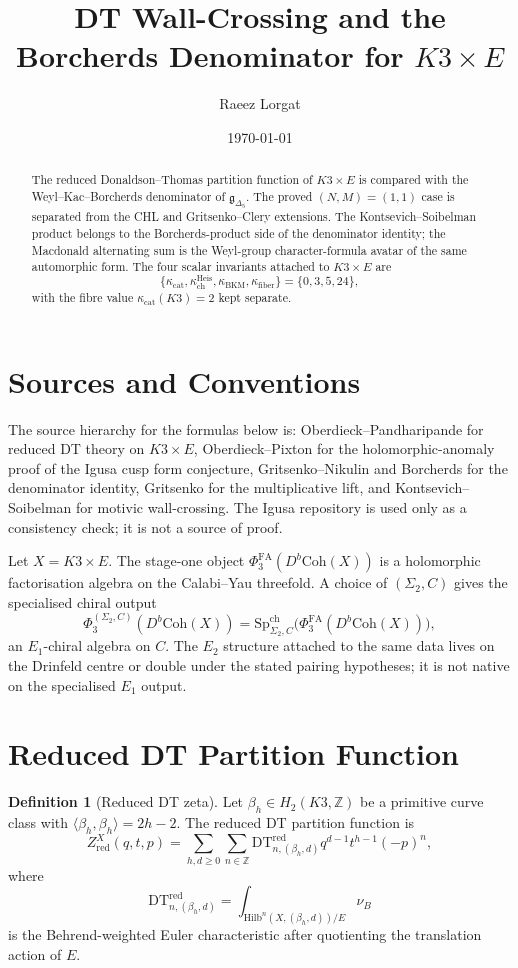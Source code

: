 \documentclass[11pt]{article}
\title{DT Wall-Crossing and the Borcherds Denominator for $K3\times E$}
\author{Raeez Lorgat}
\date{\today}
\theoremstyle{definition}
\newtheorem{definition}[theorem]{Definition}
\providecommand{\Z}{\mathbb{Z}}
\providecommand{\DT}{\mathrm{DT}}
\providecommand{\Hilb}{\mathrm{Hilb}}
\providecommand{\fg}{\mathfrak{g}}
\providecommand{\kch}{\kappa_{\mathrm{ch}}}
\providecommand{\kcat}{\kappa_{\mathrm{cat}}}
\providecommand{\kBKM}{\kappa_{\mathrm{BKM}}}
\providecommand{\kfib}{\kappa_{\mathrm{fiber}}}
\providecommand{\Eone}{E_1}
\providecommand{\Etwo}{E_2}
\providecommand{\PhiFA}{\Phi^{\mathrm{FA}}}
\providecommand{\SpCh}{\mathrm{Sp}^{\mathrm{ch}}}
\begin{document}
\maketitle

\begin{abstract}
The reduced Donaldson--Thomas partition function of $K3\times E$ is
compared with the Weyl--Kac--Borcherds denominator of
$\fg_{\Delta_5}$. The proved $(N,M)=(1,1)$ case is separated from the
CHL and Gritsenko--Clery extensions. The Kontsevich--Soibelman product
belongs to the Borcherds-product side of the denominator identity; the
Macdonald alternating sum is the Weyl-group character-formula avatar of
the same automorphic form. The four scalar invariants attached to
$K3\times E$ are
\[
 \{\kcat,\kch^{\mathrm{Heis}},\kBKM,\kfib\}=\{0,3,5,24\},
\]
with the fibre value $\kcat(K3)=2$ kept separate.
\end{abstract}

\section{Sources and Conventions}
\label{sec:sources-conventions}

The source hierarchy for the formulas below is:
Oberdieck--Pandharipande for reduced DT theory on $K3\times E$,
Oberdieck--Pixton for the holomorphic-anomaly proof of the Igusa cusp
form conjecture, Gritsenko--Nikulin and Borcherds for the
denominator identity, Gritsenko for the multiplicative lift, and
Kontsevich--Soibelman for motivic wall-crossing. The Igusa repository is
used only as a consistency check; it is not a source of proof.

Let $X=K3\times E$. The stage-one object
$\PhiFA_3(D^b\mathrm{Coh}(X))$ is a holomorphic factorisation algebra
on the Calabi--Yau threefold. A choice of $(\Sigma_2,C)$ gives the
specialised chiral output
\[
 \Phi_3^{(\Sigma_2,C)}(D^b\mathrm{Coh}(X))
 = \SpCh_{\Sigma_2,C}\bigl(\PhiFA_3(D^b\mathrm{Coh}(X))\bigr),
\]
an $\Eone$-chiral algebra on $C$. The $\Etwo$ structure attached to the
same data lives on the Drinfeld centre or double under the stated
pairing hypotheses; it is not native on the specialised $\Eone$ output.

\section{Reduced DT Partition Function}
\label{sec:reduced-dt}

\begin{definition}[Reduced DT zeta]
Let $\beta_h\in H_2(K3,\Z)$ be a primitive curve class with
$\langle \beta_h,\beta_h\rangle=2h-2$. The reduced DT partition
function is
\[
 Z^{X}_{\mathrm{red}}(q,t,p)
 =\sum_{h,d\ge 0}\sum_{n\in\Z}
 \DT^{\mathrm{red}}_{n,(\beta_h,d)}
 q^{d-1}t^{h-1}(-p)^n,
\]
where
\[
 \DT^{\mathrm{red}}_{n,(\beta_h,d)}
 =\int_{\Hilb^n(X,(\beta_h,d))/E}\nu_B
\]
is the Behrend-weighted Euler characteristic after quotienting the
translation action of $E$.
\end{definition}
\end{document}
